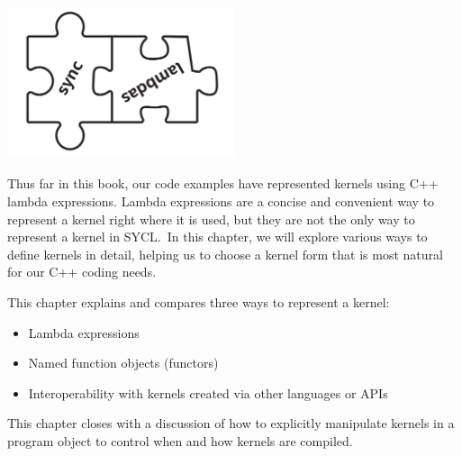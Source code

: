 \begin{center}
	\includegraphics[width=0.5\textwidth]{content/chapter-10/images/1}
\end{center}

Thus far in this book, our code examples have represented kernels using C++ lambda expressions. Lambda expressions are a concise and convenient way to represent a kernel right where it is used, but they are not the only way to represent a kernel in SYCL. In this chapter, we will explore various ways to define kernels in detail, helping us to choose a kernel form that is most natural for our C++ coding needs.\par

This chapter explains and compares three ways to represent a kernel:\par

\begin{itemize}
	\item Lambda expressions
	\item Named function objects (functors)
	\item Interoperability with kernels created via other languages or APIs
\end{itemize}

This chapter closes with a discussion of how to explicitly manipulate kernels in a program object to control when and how kernels are compiled.\par




